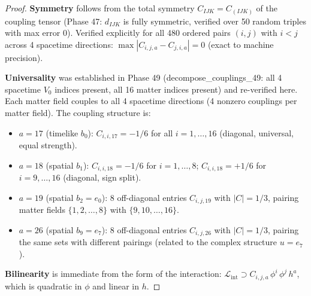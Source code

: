 \documentclass[11pt]{article}
\begin{document}
\begin{proof}
\textbf{Symmetry} follows from the total symmetry $C_{IJK} = C_{(IJK)}$
of the coupling tensor (Phase 47: $d_{IJK}$ is fully symmetric,
verified over 50 random triples with max error 0).
Verified explicitly for all 480 ordered pairs
$(i,j)$ with $i < j$ across 4 spacetime directions:
$\max |C_{i,j,a} - C_{j,i,a}| = 0$ (exact to machine precision).

\textbf{Universality} was established in Phase 49
(decompose\_couplings\_49: all 4 spacetime $V_0$ indices present,
all 16 matter indices present) and re-verified here. Each matter
field couples to all 4 spacetime directions (4 nonzero couplings per
matter field). The coupling structure is:
\begin{itemize}
\item $a = 17$ (timelike $b_0$): $C_{i,i,17} = -1/6$ for all $i = 1,\ldots,16$
  (diagonal, universal, equal strength).
\item $a = 18$ (spatial $b_1$): $C_{i,i,18} = -1/6$ for $i = 1,\ldots,8$;
  $C_{i,i,18} = +1/6$ for $i = 9,\ldots,16$ (diagonal, sign split).
\item $a = 19$ (spatial $b_2 = e_0$): 8 off-diagonal entries
  $C_{i,j,19}$ with $|C| = 1/3$, pairing matter fields $\{1,2,\ldots,8\}$
  with $\{9,10,\ldots,16\}$.
\item $a = 26$ (spatial $b_9 = e_7$): 8 off-diagonal entries
  $C_{i,j,26}$ with $|C| = 1/3$, pairing the same sets with
  different pairings (related to the complex structure $u = e_7$).
\end{itemize}

\textbf{Bilinearity} is immediate from the form of the interaction:
$\mathcal{L}_{\mathrm{int}} \supset C_{i,j,a}\,\phi^i\,\phi^j\,h^a$,
which is quadratic in $\phi$ and linear in $h$.
\end{proof}
\end{document}
